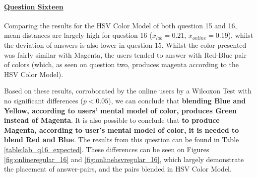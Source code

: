 \paragraph{\ul{Question Sixteen}}
%
Comparing the results for the HSV Color Model of both question 15 and 16, mean distances are largely high for question 16
($\overline{x}_{lab} = 0.21$, $\overline{x}_{online} = 0.19$), whilst the deviation of answers is also lower in question 15.
Whilst the color presented was fairly similar with Magenta, the users tended to answer with Red-Blue pair of colors (which, as seen on question two, produces magenta according
to the HSV Color Model). \par
%
Based on these results, corroborated by the online users by a Wilcoxon Test with no significant differences ($p < 0.05$), we can conclude that \textbf{blending Blue and Yellow, according to users' mental model of color, produces Green instead of Magenta}. It is also
possible to conclude that \textbf{to produce Magenta, according to user's mental model of color, it is needed to blend Red and Blue}. The results from
this question can be found in Table \ref{table:lab_q16_expected}. These differences can be seen on Figures \ref{fig:onlineregular_16} and \ref{fig:onlinehsvregular_16}, which largely
demonstrate the placement of answer-pairs, and the pairs blended in HSV Color Model.
%
